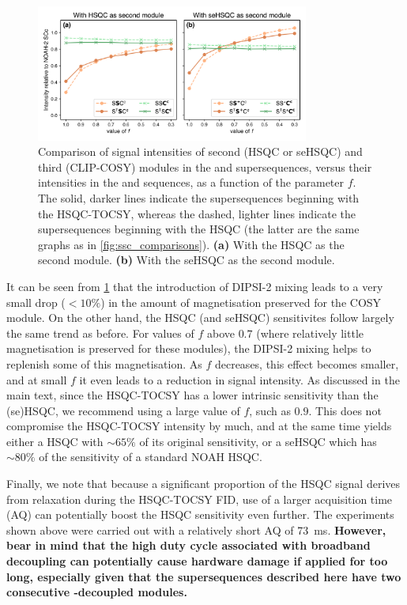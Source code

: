 \begin{figure}
    \centering
    \includegraphics[width=0.8\textwidth]{./figures/stsc_comparisons.png}
    \caption{
        Comparison of signal intensities of second (HSQC or seHSQC) and third (CLIP-COSY) modules in the  and  supersequences, versus their intensities in the  and  sequences, as a function of the parameter $f$.
        The solid, darker lines indicate the supersequences beginning with the HSQC-TOCSY, whereas the dashed, lighter lines indicate the supersequences beginning with the HSQC (the latter are the same graphs as in \cref{fig:ssc_comparisons}).
        \textbf{(a)} With the HSQC as the second module.
        \textbf{(b)} With the seHSQC as the second module.
        \andro{}
    }
    \label{fig:stsc_comparisons}
\end{figure}

It can be seen from \cref{fig:stsc_comparisons} that the introduction of DIPSI-2 mixing leads to a very small drop ($< 10\%$) in the amount of  magnetisation preserved for the COSY module.
On the other hand, the HSQC (and seHSQC) sensitivites follow largely the same trend as before.
For values of $f$ above $0.7$ (where relatively little  magnetisation is preserved for these modules), the DIPSI-2 mixing helps to replenish some of this magnetisation.
As $f$ decreases, this effect becomes smaller, and at small $f$ it even leads to a reduction in signal intensity.
As discussed in the main text, since the HSQC-TOCSY has a lower intrinsic sensitivity than the (se)HSQC, we recommend using a large value of $f$, such as $0.9$.
This does not compromise the HSQC-TOCSY intensity by much, and at the same time yields either a HSQC with $\sim 65\%$ of its original sensitivity, or a seHSQC which has $\sim 80\%$ of the sensitivity of a standard NOAH HSQC.

Finally, we note that because a significant proportion of the HSQC signal derives from  relaxation during the HSQC-TOCSY FID, use of a larger acquisition time (AQ) can potentially boost the HSQC sensitivity even further.
The experiments shown above were carried out with a relatively short AQ of \SI{73}{\ms}.
\textbf{However, bear in mind that the high duty cycle associated with broadband  decoupling can potentially cause hardware damage if applied for too long, especially given that the supersequences described here have two consecutive -decoupled modules.}

